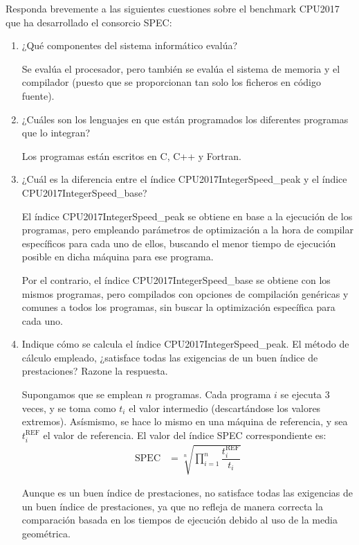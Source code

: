 \begin{comment}Sol:
    1. El sistema B obtiene un mayor rendimiento. En particular, las mejoras sobre el sistema A en los índices SPECint\_base y SPECint son, respectivamente, 1,33 y 1,33 (se obtiene la misma ganancia en ambos casos).
    2. La optimización de la compilación permite obtener una mejora, en ambos casos, de 1,07.
    3. En teoría no afectará porque los índices mostrados afectan únicamente a la aritmética entera.
    4. No se puede saber porque este benchmark es de aritmética en coma flotante.
\end{comment}

\begin{ejercicio}\label{ej:4.10}
Responda brevemente a las siguientes cuestiones sobre el benchmark CPU2017 que ha desarrollado el consorcio SPEC:
\begin{enumerate}
    \item ¿Qué componentes del sistema informático evalúa?
    
    Se evalúa el procesador, pero también se evalúa el sistema de memoria y el compilador (puesto que se proporcionan tan solo los ficheros en código fuente).
    \item ¿Cuáles son los lenguajes en que están programados los diferentes programas que lo integran?
    
    Los programas están escritos en C, C++ y Fortran.
    \item ¿Cuál es la diferencia entre el índice CPU2017IntegerSpeed\_peak y el índice CPU2017IntegerSpeed\_base?
    
    El índice CPU2017IntegerSpeed\_peak se obtiene en base a la ejecución de los programas, pero empleando parámetros de optimización a la hora de compilar específicos para cada uno de ellos, buscando el menor tiempo de ejecución posible en dicha máquina para ese programa.

    Por el contrario, el índice CPU2017IntegerSpeed\_base se obtiene con los mismos programas, pero compilados con opciones de compilación genéricas y comunes a todos los programas, sin buscar la optimización específica para cada uno.
    \item Indique cómo se calcula el índice CPU2017IntegerSpeed\_peak. El método de cálculo empleado, ¿satisface todas las exigencias de un buen índice de prestaciones? Razone la respuesta.
    
    Supongamos que se emplean $n$ programas. Cada programa $i$ se ejecuta $3$ veces, y se toma como $t_i$ el valor intermedio (descartándose los valores extremos). Asísmismo, se hace lo mismo en una máquina de referencia, y sea $t_i^{\text{REF}}$ el valor de referencia. El valor del índice SPEC correspondiente es:
    \begin{align*}
        \text{SPEC} &= \sqrt[n]{\prod_{i=1}^{n} \dfrac{t_i^{\text{REF}}}{t_i}}
    \end{align*}

    Aunque es un buen índice de prestaciones, no satisface todas las exigencias de un buen índice de prestaciones, ya que no refleja de manera correcta la comparación basada en los tiempos de ejecución debido al uso de la media geométrica.
\end{enumerate}
\end{ejercicio}
